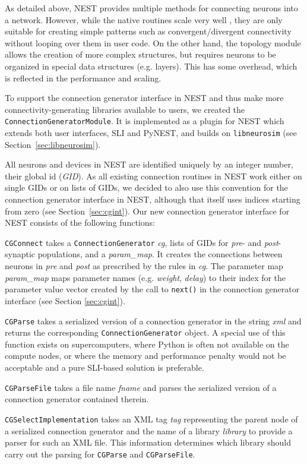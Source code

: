 \documentclass{frontiersSCNS} %
\begin{document}
As detailed above, NEST provides multiple methods for connecting
neurons into a network. However, while the native routines scale very
well \citep{Helias12_26}, they are only suitable for creating simple
patterns such as convergent/divergent connectivity without looping
over them in user code. On the other hand, the topology module
\citep{Plesser_13} allows the creation of more complex structures, but
requires neurons to be organized in special data structures (e.g.
layers). This has some overhead, which is reflected in the
performance and scaling.

To support the connection generator interface in NEST and thus make
more connectivity-generating libraries available to users, we created
the \verb|ConnectionGeneratorModule|. It is implemented as a plugin
for NEST which extends both user interfaces, SLI and PyNEST, and
builds on \verb|libneurosim| (see Section~\ref{sec:libneurosim}).

All neurons and devices in NEST are identified uniquely by an integer
number, their global id (\emph{GID}). As all existing connection
routines in NEST work either on single GIDs or on lists of GIDs, we
decided to also use this convention for the connection generator
interface in NEST, although that itself uses indices starting from
zero (see Section~\ref{sec:cgint}). Our new connection generator
interface for NEST consists of the following functions:

\begin{unlist}
\item[{\tt CGConnect} ] takes a \verb|ConnectionGenerator| \emph{cg},
  lists of GIDs for \emph{pre}- and \emph{post}-synaptic
  populations, and a \emph{param\_map}. It creates the connections
  between neurons in \emph{pre} and \emph{post} as prescribed by
  the rules in \emph{cg}. The parameter map \emph{param\_map} maps
  parameter names (e.g. \emph{weight}, \emph{delay}) to their index
  for the parameter value vector created by the call to \verb|next()|
  in the connection generator interface (see Section
  \ref{sec:cgint}).
\item[{\tt CGParse} ] takes a serialized version of a connection
  generator in the string \emph{xml} and returns the corresponding
  \verb|ConnectionGenerator| object. A special use of this function
  exists on supercomputers, where Python is often not available on the
  compute nodes, or where the memory and performance penalty would not
  be acceptable and a pure SLI-based solution is preferable.
\item[{\tt CGParseFile} ] takes a file name \emph{fname} and parses the
  serialized version of a connection generator contained therein.
\item[{\tt CGSelectImplementation} ] takes an XML tag \emph{tag}
  representing the parent node of a serialized connection generator
  and the name of a library \emph{library} to provide a parser for
  such an XML file. This information determines which library should
  carry out the parsing for \verb|CGParse| and \verb|CGParseFile|.
\end{unlist}
\end{document}
